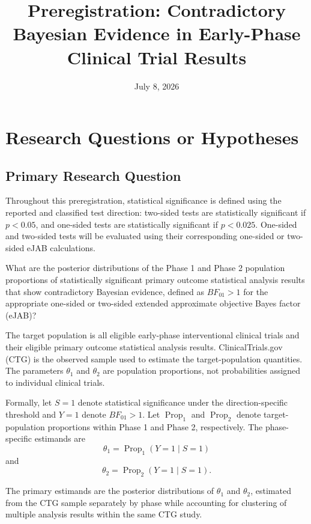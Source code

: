 \documentclass[11pt]{article}
\title{Preregistration: Contradictory Bayesian Evidence in Early-Phase Clinical Trial Results}
\author{}
\date{July 8, 2026}
\begin{document}
\maketitle

\section{Research Questions or Hypotheses}

\subsection{Primary Research Question}

Throughout this preregistration, statistical significance is defined using the reported and classified test direction: two-sided tests are statistically significant if \(p<0.05\), and one-sided tests are statistically significant if \(p<0.025\). One-sided and two-sided tests will be evaluated using their corresponding one-sided or two-sided eJAB calculations.

What are the posterior distributions of the Phase 1 and Phase 2 population proportions of statistically significant primary outcome statistical analysis results that show contradictory Bayesian evidence, defined as \(BF_{01} > 1\) for the appropriate one-sided or two-sided extended approximate objective Bayes factor (eJAB)?

The target population is all eligible early-phase interventional clinical trials and their eligible primary outcome statistical analysis results. ClinicalTrials.gov (CTG) is the observed sample used to estimate the target-population quantities. The parameters \(\theta_1\) and \(\theta_2\) are population proportions, not probabilities assigned to individual clinical trials.

Formally, let \(S=1\) denote statistical significance under the direction-specific threshold and \(Y=1\) denote \(BF_{01}>1\). Let \(\operatorname{Prop}_{1}\) and \(\operatorname{Prop}_{2}\) denote target-population proportions within Phase 1 and Phase 2, respectively. The phase-specific estimands are
\[
\theta_1 = \operatorname{Prop}_{1}(Y=1 \mid S=1)
\]
and
\[
\theta_2 = \operatorname{Prop}_{2}(Y=1 \mid S=1).
\]

The primary estimands are the posterior distributions of \(\theta_1\) and \(\theta_2\), estimated from the CTG sample separately by phase while accounting for clustering of multiple analysis results within the same CTG study.
\end{document}
